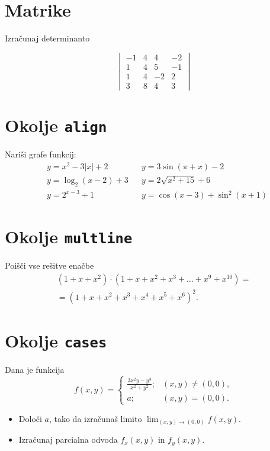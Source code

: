 \documentclass[a4paper,12pt]{article}
\begin{document}
\section*{Matrike}
Izračunaj determinanto

\[
\begin{vmatrix}
   -1 & 4 & 4 & -2 \\
   1 & 4 & 5 & -1 \\
   1 & 4 & -2 & 2 \\
   3 & 8 & 4 & 3 
\end{vmatrix}
\]

\section*{Okolje \texttt{align}}
Nariši grafe funkcij:
\begin{align*}
   &y = x^2 - 3|x| + 2   & &y = 3 \sin(\pi+x) - 2\\
   &y = \log_2(x-2) + 3  & &y = 2 \sqrt{x^2+15} + 6\\
   &y = 2^{x-3} + 1      & &y = \cos(x-3) + \sin^2(x+1)
\end{align*}

\section*{Okolje \texttt{multline}}
Poišči vse rešitve enačbe
\begin{multline*}
   (1+x+x^2) \cdot (1+x+x^2+x^3+\ldots+x^9+x^{10}) =\\
   =(1+x+x^2+x^3+x^4+x^5+x^6)^2.
\end{multline*}

\section*{Okolje \texttt{cases}}
Dana je funkcija
   \[
   f(x,y)=
   \begin{cases}
      \frac{3x^2y-y^3}{x^2+y^2}; &(x,y)\neq(0,0),\\
      a; &(x,y)=(0,0).
   \end{cases}
   \]
\begin{itemize}
\item Določi \(a\), tako da izračunaš limito \( \lim_{(x,y)\to(0,0)} f(x,y) \).
\item Izračunaj parcialna odvoda \(f_x(x,y)\) in \(f_y(x,y)\).
\end{itemize}
\end{document}
